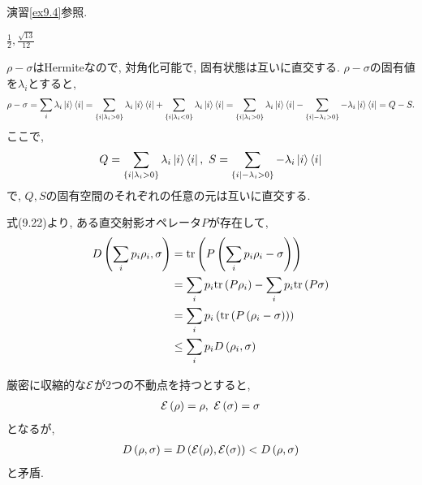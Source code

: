 \begin{ex}
    \label{ex9.5}
    演習\ref{ex9.4}参照.
\end{ex}

\begin{ex}
    \label{ex9.6}
    $\frac{1}{2}, \frac{\sqrt{13}}{12}$
\end{ex}

\begin{ex}
    \label{ex9.7}
    $\rho - \sigma$はHermiteなので, 対角化可能で, 固有状態は互いに直交する. $\rho - \sigma$の固有値を$\lambda_i$とすると,
    \begin{align*}
        \rho - \sigma = \sum_i \lambda_i \ket{i}\bra{i}=
        \sum_{\{i| \lambda_i > 0\}} \lambda_i \ket{i}\bra{i}
        +
        \sum_{\{i| \lambda_i < 0\}} \lambda_i \ket{i}\bra{i}
        =
        \sum_{\{i| \lambda_i > 0\}} \lambda_i \ket{i}\bra{i}
        -
        \sum_{\{i| -\lambda_i > 0\}} -\lambda_i \ket{i}\bra{i}
        =
        Q - S.
    \end{align*}
    ここで,
    \begin{align*}
        Q = \sum_{\{i| \lambda_i > 0\}} \lambda_i \ket{i}\bra{i}, \
        S = \sum_{\{i| - \lambda_i > 0\}} -\lambda_i \ket{i}\bra{i}
    \end{align*}
    で, $Q,S$の固有空間のそれぞれの任意の元は互いに直交する.
\end{ex}

\begin{ex}
    \label{ex9.8}
    式(9.22)より, ある直交射影オペレータ$P$が存在して,
    \begin{align*}
        D \left(\sum_i p_i \rho_i, \sigma\right)
         & =
        \mathrm{tr} \left( P \left( \sum_i p_i \rho_i - \sigma \right)\right)
        \\
         & =
        \sum_i p_i \mathrm{tr} \left( P \rho_i \right)
        -
        \sum_i p_i \mathrm{tr} \left( P \sigma\right)
        \\
         & =
        \sum_i p_i
        \left(
        \mathrm{tr} \left( P \left( \rho_i - \sigma \right) \right)
        \right)
        \\
         & \leq
        \sum_i p_i D\left(\rho_i, \sigma\right)
    \end{align*}
\end{ex}

\begin{ex}
    \label{ex9.9}
\end{ex}

\begin{ex}
    \label{ex9.10}
    厳密に収縮的な$\mathcal{E}$が2つの不動点を持つとすると,
    \begin{align*}
        \mathcal{E} \left( \rho\right) = \rho, \ \mathcal{E} \left( \sigma\right) = \sigma
    \end{align*}
    となるが,
    \begin{align*}
        D \left( \rho , \sigma\right)
        =
        D \left( \mathcal{E}(\rho) , \mathcal{E}(\sigma)\right)
        <
        D \left( \rho , \sigma\right)
    \end{align*}
    と矛盾.
\end{ex}

